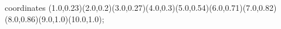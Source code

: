 					coordinates { (1.0,0.23)(2.0,0.2)(3.0,0.27)(4.0,0.3)(5.0,0.54)(6.0,0.71)(7.0,0.82)(8.0,0.86)(9.0,1.0)(10.0,1.0)};